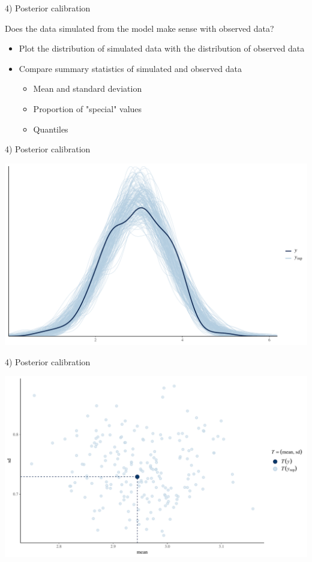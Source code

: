 \documentclass[ignorenonframetext,a4paper]{beamer}
\begin{document}
\begin{frame}{4) Posterior calibration}

Does the data simulated from the model make sense with observed data?

\begin{itemize}
\setlength\itemsep{1em}
  \item{Plot the distribution of simulated data with the distribution
        of observed data}
  \item{Compare summary statistics of simulated and observed data}
  \begin{itemize}
    \setlength\itemsep{1em}
    \item{Mean and standard deviation}
    \item{Proportion of "special" values}
    \item{Quantiles}
\end{itemize}  
\end{itemize}

\end{frame}

\begin{frame}{4) Posterior calibration}

\includegraphics{DB_presentation_slides_files/figure-beamer/unnamed-chunk-7-1.pdf}

\end{frame}

\begin{frame}{4) Posterior calibration}

\includegraphics{DB_presentation_slides_files/figure-beamer/unnamed-chunk-8-1.pdf}

\end{frame}
\end{document}

